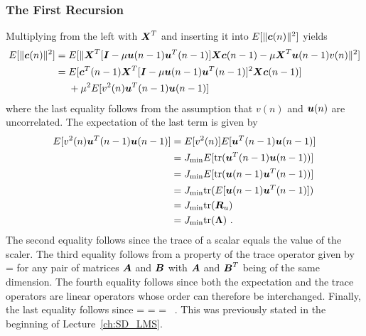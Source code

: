 \subsubsection{The First Recursion}
Multiplying  from the left with $\boldsymbol{X}^T$ and inserting it into $E[\|\boldsymbol{c}(n)\|^2]$ yields
\begin{align}
  E[\|\boldsymbol{c}(n)\|^2] ={}& E[\|\boldsymbol{X}^T[\boldsymbol{I}-\mu\boldsymbol{u}(n-1)\boldsymbol{u}^T(n-1)]\boldsymbol{X}\boldsymbol{c}(n-1)-\mu\boldsymbol{X}^T\boldsymbol{u}(n-1)v(n)\|^2]\\
   ={}& E[\boldsymbol{c}^T(n-1)\boldsymbol{X}^T[\boldsymbol{I}-\mu \boldsymbol{u}(n-1)\boldsymbol{u}^T(n-1)]^2\boldsymbol{X}\boldsymbol{c}(n-1)]\notag\\
   &{}+\mu^2E[v^2(n)\boldsymbol{u}^T(n-1)\boldsymbol{u}(n-1)]
   \label{eq:app_lms_first_recur_start}
\end{align}
where the last equality follows from the assumption that $v(n)$ and $\boldsymbol{u}(n)$ are uncorrelated.
The expectation of the last term is given by
\begin{align}
 E[v^2(n)\boldsymbol{u}^T(n-1)\boldsymbol{u}(n-1)] &= E[v^2(n)]E[\boldsymbol{u}^T(n-1)\boldsymbol{u}(n-1)]\\
 &= J_\textup{min} E[\textup{tr}(\boldsymbol{u}^T(n-1)\boldsymbol{u}(n-1))]\\
 &= J_\textup{min} E[\textup{tr}(\boldsymbol{u}(n-1)\boldsymbol{u}^T(n-1))]\\
 &= J_\textup{min} \textup{tr}(E[\boldsymbol{u}(n-1)\boldsymbol{u}^T(n-1)])\\
 &= J_\textup{min} \textup{tr}(\boldsymbol{R}_u)\\
 &= J_\textup{min} \textup{tr}(\boldsymbol{\Lambda})\ .
\end{align}
The second equality follows since the trace of a scalar equals the value of the scaler. The third equality follows from a property of the trace operator given by
\bmath
   = 
\emath
for any pair of matrices $\boldsymbol{A}$ and $\boldsymbol{B}$ with $\boldsymbol{A}$ and $\boldsymbol{B}^T$ being of the same dimension. The fourth equality follows since both the expectation and the trace operators are linear operators whose order can therefore be interchanged. Finally, the last equality follows since
\bmath
   =  =  = \tr{\vect{\Lambda}}\ .
\emath
This was previously stated in the beginning of Lecture~\ref{ch:SD_LMS}.

